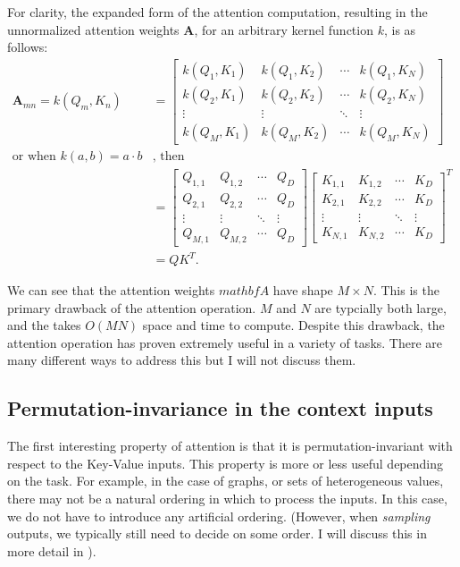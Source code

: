 For clarity, the expanded form of the attention computation, resulting in the unnormalized attention weights $\mathbf{A}$, for an arbitrary kernel function $k$, is as follows:
\begin{align*}
\mathbf{A}_{mn} = k(Q_m, K_n)
&= \begin{bmatrix}
    k(Q_{1}, K_{1}) & k(Q_{1}, K_{2}) & \cdots & k(Q_{1}, K_{N}) \\
    k(Q_{2}, K_{1}) & k(Q_{2}, K_{2}) & \cdots & k(Q_{2}, K_{N}) \\
    \vdots & \vdots & \ddots & \vdots \\
    k(Q_{M}, K_{1}) & k(Q_{M}, K_{2}) & \cdots & k(Q_{M}, K_{N})
\end{bmatrix} \\
\text{or when\ } k(a, b) = a \cdot b &\text{, then} \\
&= \begin{bmatrix}
    Q_{1,1} & Q_{1,2} & \cdots & Q_D \\
    Q_{2,1} & Q_{2,2} & \cdots & Q_D \\
    \vdots & \vdots & \ddots & \vdots \\
    Q_{M,1} & Q_{M,2} & \cdots & Q_D
\end{bmatrix} \begin{bmatrix}
    K_{1,1} & K_{1,2} & \cdots & K_D \\
    K_{2,1} & K_{2,2} & \cdots & K_D \\
    \vdots & \vdots & \ddots & \vdots \\
    K_{N,1} & K_{N,2} & \cdots & K_D
\end{bmatrix}^T \\
&= Q K^T .
\end{align*}

We can see that the attention weights $mathbf{A}$ have shape $M×N$. This is the primary drawback of the attention operation. $M$ and $N$ are typcially both large, and the takes $O(MN)$ space and time to compute. Despite this drawback, the attention operation has proven extremely useful in a variety of tasks. There are many different ways to address this but I will not discuss them.

\subsection{Permutation-invariance in the context inputs}

The first interesting property of attention is that it is permutation-invariant with respect to the Key-Value inputs. This property is more or less useful depending on the task. For example, in the case of graphs, or sets of heterogeneous values, there may not be a natural ordering in which to process the inputs. In this case, we do not have to introduce any artificial ordering. (However, when \textit{sampling} outputs, we typically still need to decide on some order. I will discuss this in more detail in ).


